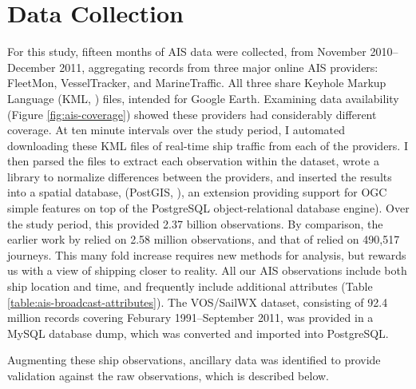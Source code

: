 \section{Data Collection}

For this study, fifteen months of AIS data were collected, from November 2010--December 2011, aggregating records from three major online AIS providers: FleetMon, VesselTracker, and MarineTraffic. All three share Keyhole Markup Language (KML, \citeauthor{KML}) files, intended for Google Earth. Examining data availability (Figure \ref{fig:ais-coverage}) showed these providers had considerably different coverage. At ten minute intervals over the study period, I automated downloading these KML files of real-time ship traffic from each of the providers. I then parsed the files to extract each observation within the dataset, wrote a library to normalize differences between the providers, and inserted the results into a spatial database, (PostGIS, \citeauthor{ramsey2005postgis}), an extension providing support for OGC simple features \citep{OGCSimple} on top of the PostgreSQL \citep{postgresql} object-relational database engine). Over the study period, this provided 2.37 billion observations. By comparison, the earlier work by \cite{Halpern2008} relied on 2.58 million observations, and that of \cite{Kaluza2010} relied on 490,517 journeys. This many fold increase requires new methods for analysis, but rewards us with a view of shipping closer to reality. %
All our AIS observations include both ship location and time, and frequently include additional attributes (Table \ref{table:ais-broadcast-attributes}).  The VOS/SailWX dataset, consisting of 92.4 million records covering Feburary 1991--September 2011, was provided in a MySQL database dump, which was converted and imported into PostgreSQL. 

Augmenting these ship observations, ancillary data was identified to provide validation against the raw observations, which is described below.

